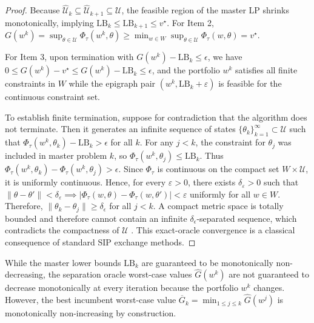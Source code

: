 \documentclass[smallextended]{svjour3}
\begin{document}
\begin{proof}
Because $\widehat{\mathcal{U}}_k \subseteq \widehat{\mathcal{U}}_{k+1} \subseteq \mathcal{U}$, the feasible region of the master LP shrinks monotonically, implying $\mathrm{LB}_k \le \mathrm{LB}_{k+1} \le v^\star$. For Item 2, $G(w^k) = \sup_{\theta \in \mathcal{U}} \Phi_\tau(w^k, \theta) \ge \min_{w \in W} \sup_{\theta \in \mathcal{U}} \Phi_\tau(w, \theta) = v^\star$.

For Item 3, upon termination with $G(w^k) - \mathrm{LB}_k \le \epsilon$, we have $0 \le G(w^k) - v^\star \le G(w^k) - \mathrm{LB}_k \le \epsilon$, and the portfolio $w^k$ satisfies all finite constraints in $W$ while the epigraph pair $(w^k, \mathrm{LB}_k+\varepsilon)$ is feasible for the continuous constraint set.

To establish finite termination, suppose for contradiction that the algorithm does not terminate. Then it generates an infinite sequence of states $\{\theta_k\}_{k=1}^\infty \subset \mathcal{U}$ such that $\Phi_\tau(w^k, \theta_k) - \mathrm{LB}_k > \epsilon$ for all $k$. For any $j < k$, the constraint for $\theta_j$ was included in master problem $k$, so $\Phi_\tau(w^k, \theta_j) \le \mathrm{LB}_k$. Thus $\Phi_\tau(w^k, \theta_k) - \Phi_\tau(w^k, \theta_j) > \epsilon$. Since $\Phi_\tau$ is continuous on the compact set $W\times \mathcal{U}$, it is uniformly continuous. Hence, for every $\varepsilon>0$, there exists $\delta_\varepsilon>0$ such that $\|\theta-\theta'\|<\delta_\varepsilon \implies |\Phi_\tau(w,\theta)-\Phi_\tau(w,\theta')|<\varepsilon$ uniformly for all $w\in W$. Therefore, $\|\theta_k - \theta_j\| \ge \delta_\epsilon$ for all $j < k$. A compact metric space is totally bounded and therefore cannot contain an infinite $\delta_\epsilon$-separated sequence, which contradicts the compactness of $\mathcal{U}$ \cite{hettich1993semi, lopez2007semi}. This exact-oracle convergence is a classical consequence of standard SIP exchange methods.
\end{proof}


\begin{remark}
While the master lower bounds $\mathrm{LB}_k$ are guaranteed to be monotonically non-decreasing, the separation oracle worst-case values $\widehat{G}(w^k)$ are not guaranteed to decrease monotonically at every iteration because the portfolio $w^k$ changes. However, the best incumbent worst-case value $\overline{G}_k = \min_{1 \le j \le k} \widehat{G}(w^j)$ is monotonically non-increasing by construction.
\end{remark}
\end{document}

